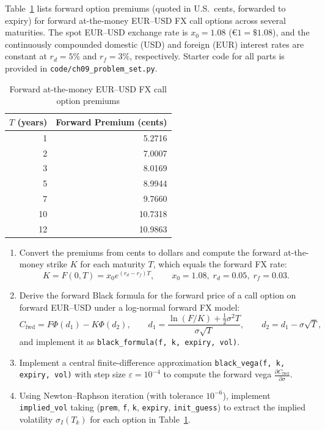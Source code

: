 \begin{problem}
    Table~\ref{tab:fx-fwd-premiums} lists forward option premiums (quoted in U.S.\ cents, forwarded to expiry) for forward at-the-money EUR--USD FX call options across several maturities. The spot EUR--USD exchange rate is $x_0 = 1.08$ ($€1 = \$1.08$), and the continuously compounded domestic (USD) and foreign (EUR) interest rates are constant at $r_d = 5\%$ and $r_f = 3\%$, respectively. Starter code for all parts is provided in \texttt{code/ch09\_problem\_set.py}.
    \begin{table}[!htbp]
        \centering
        \caption{Forward at-the-money EUR--USD FX call option premiums}\label{tab:fx-fwd-premiums}
        \begin{tabular}{rr}
            \toprule
            $T$ (years) & Forward Premium (cents) \\
            \midrule
            1 & 5.2716 \\
            2 & 7.0007 \\
            3 & 8.0169 \\
            5 & 8.9944 \\
            7 & 9.7660 \\
            10 & 10.7318 \\
            12 & 10.9863 \\
            \bottomrule
        \end{tabular}
    \end{table}
    \begin{enumerate}
        \item Convert the premiums from cents to dollars and compute the forward at-the-money strike $K$ for each maturity $T$, which equals the forward FX rate:
        \[
        K = F(0, T) = x_0 e^{(r_d - r_f)T}, \qquad x_0 = 1.08,\; r_d = 0.05,\; r_f = 0.03.
        \]
        \item Derive the forward Black formula for the forward price of a call option on forward EUR--USD under a log-normal forward FX model:
        \[
        C_{\text{fwd}} = F\Phi(d_1) - K\Phi(d_2), \qquad d_1 = \frac{\ln(F/K) + \frac{1}{2}\sigma^2 T}{\sigma\sqrt{T}}, \qquad d_2 = d_1 - \sigma\sqrt{T},
        \]
        and implement it as \texttt{black\_formula(f, k, expiry, vol)}.
        \item Implement a central finite-difference approximation \texttt{black\_vega(f, k, expiry, vol)} with step size $\varepsilon = 10^{-4}$ to compute the forward vega $\frac{\partial C_{\text{fwd}}}{\partial \sigma}$.
        \item Using Newton--Raphson iteration (with tolerance $10^{-6}$), implement \texttt{implied\_vol} taking (\texttt{prem}, \texttt{f}, \texttt{k}, \texttt{expiry}, \texttt{init\_guess}) to extract the implied volatility $\sigma_I(T_k)$ for each option in Table~\ref{tab:fx-fwd-premiums}.

\end{enumerate}
\end{problem}
